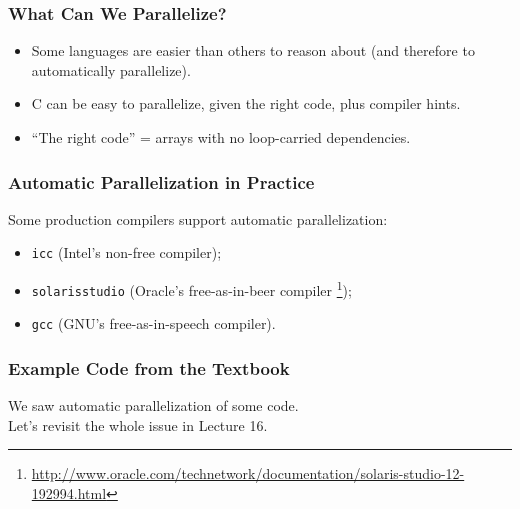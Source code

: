 \documentclass[aspectratio=43]{beamer}
\newenvironment{changemargin}[1]{%
  \begin{list}{}{%
    \setlength{\topsep}{0pt}%
    \setlength{\leftmargin}{#1}%
    \setlength{\rightmargin}{1em}
    \setlength{\listparindent}{\parindent}%
    \setlength{\itemindent}{\parindent}%
    \setlength{\parsep}{\parskip}%
  }%
  \item[]}{\end{list}}
\begin{document}
\begin{frame}
  \frametitle{What Can We Parallelize?}

  \begin{changemargin}{2.5cm}
  
  \begin{itemize}
    \item Some languages are easier than others to reason about (and therefore to
      automatically parallelize).
    \item C can be easy to parallelize, given the right code, plus compiler hints.
    \item ``The right code'' = arrays with no loop-carried dependencies.
  \end{itemize}
  \end{changemargin}
\end{frame}

\begin{frame}
  \frametitle{Automatic Parallelization in Practice}
  \begin{changemargin}{2cm}
    Some production compilers support automatic parallelization: 
    \begin{itemize}
      \item {\tt icc} (Intel's
      non-free compiler);
      \item {\tt solarisstudio} (Oracle's free-as-in-beer
      compiler \footnote{\tiny \url{http://www.oracle.com/technetwork/documentation/solaris-studio-12-192994.html}});
      \item {\tt gcc} (GNU's free-as-in-speech compiler).
    \end{itemize}
  \end{changemargin}

\end{frame}

\begin{frame}[fragile]
  \frametitle{Example Code from the Textbook}

  \begin{changemargin}{1.5cm}
    We saw automatic parallelization of some code.\\
    Let's revisit the whole issue in Lecture 16.
  \end{changemargin}
  
\end{frame}
\end{document}
